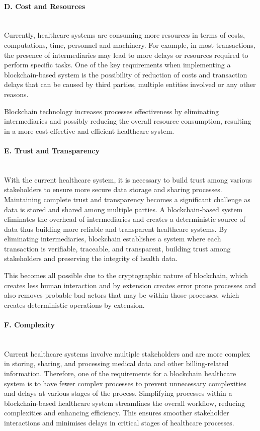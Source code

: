 \paragraph{D. Cost and Resources} \mbox{}\\
Currently, healthcare systems are consuming more resources in terms of costs, computations, time, personnel and machinery. For example, in most transactions, the presence of intermediaries may lead to more delays or resources required to perform specific tasks. One of the key requirements when implementing a blockchain-based system is the possibility of reduction of costs and transaction delays that can be caused by third parties, multiple entities involved or any other reasons.

Blockchain technology increases processes effectiveness by eliminating intermediaries and possibly reducing the overall resource consumption, resulting in a more cost-effective and efficient healthcare system.
\paragraph{E. Trust and Transparency} \mbox{}\\
With the current healthcare system, it is necessary to build trust among various stakeholders to ensure more secure data storage and sharing processes. Maintaining complete trust and transparency becomes a significant challenge as data is stored and shared among multiple parties. A blockchain-based system eliminates the overhead of intermediaries and creates a deterministic source of data thus building more reliable and transparent healthcare systems.
By eliminating intermediaries, blockchain establishes a system where each transaction is verifiable, traceable, and transparent, building trust among stakeholders and preserving the integrity of health data.

This becomes all possible due to the cryptographic nature of blockchain, which creates less human interaction and by extension creates error prone processes and also removes probable bad actors that may be within those processes, which creates deterministic operations by extension.
\paragraph{F. Complexity} \mbox{}\\
Current healthcare systems involve multiple stakeholders and are more complex in storing, sharing, and processing medical data and other billing-related information. Therefore, one of the requirements for a blockchain healthcare system is to have fewer complex processes to prevent unnecessary complexities and delays at various stages of the process.
Simplifying processes within a blockchain-based healthcare system streamlines the overall workflow, reducing complexities and enhancing efficiency. This ensures smoother stakeholder interactions and minimises delays in critical stages of healthcare processes.

